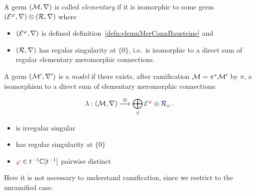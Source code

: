 \begin{defn}
  A germ $(\mathcal{M},\nabla)$ is called \emph{elementary} if it is isomorphic to
  some germ $(\mathcal{E}^\varphi,\nabla)\otimes(\mathcal{R},\nabla)$ where
  \begin{itemize}
    \item $(\mathcal{E}^\varphi,\nabla)$ is defined 
      definition~\ref{defn:elemnMerConnBausteine} and
    \item $(\mathcal{R},\nabla)$ has regular singularity at $\{0\}$, i.e.\ is
      isomorphic to a direct sum of regular elementary meromorphic connections.
  \end{itemize}
\end{defn}
\begin{defn}\label{defn:model}
  \def\myPhi{\textcolor{red!60!black}{\phi}}
  \def\myE{\textcolor{green!40!black}{\cE^{\myPhi}}}
  A germ $(\mathcal{M}',\nabla')$ is a \emph{model} if there exists, after ramification
  $\mathcal{M}=\pi^*\mathcal{M}'$ by $\pi$, a isomorphism to a direct sum of elementary
  meromorphic connections:
  \begin{multicols}{2}
    \[
      \lambda:(\cM,\nabla)
      \overset{\cong}{\longrightarrow}
      \bigoplus_{~\tikzmark{e3}\!\!\myPhi}
      \overset{\tikzmark{e2}}{\myE}
      \otimes
      \overset{\tikzmark{e1}}{\textcolor{blue!40!black}{\cR_{\myPhi}}}
      \,.
    \]
    \columnbreak{}
    \begin{itemize}
      \item[\tikzmarkb{n2}{green}] is irregular singular
      \item[\tikzmarkc{n1}{blue}] has regular singularity at $\{0\}$
      \item[\tikzmarkc{n3}{red}] $\myPhi\in t^{-1}\C[t^{-1}]$ pairwise distinct
    \end{itemize}
  \end{multicols}
  \begin{s-rem}
    Here it is not necessary to understand ramification, since we restrict to
    the unramified case.
  \end{s-rem}
\end{defn}
